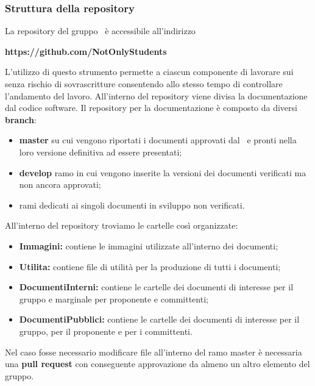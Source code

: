 \subsubsection{Struttura della repository}\label{StrutturaRepo}
La repository del gruppo \Gruppo\ è accessibile all'indirizzo
\begin{center}
	\textbf{https://github.com/NotOnlyStudents}
\end{center}
L'utilizzo di questo strumento permette a ciascun componente di lavorare sui  senza rischio di sovrascritture consentendo allo stesso tempo di controllare l'andamento del lavoro. 
All'interno del repository viene divisa la documentazione dal codice software.
\label{RepoDoc}Il repository per la documentazione è composto da diversi \textbf{branch}:
\begin{itemize}
	\item \textbf{master} su cui vengono riportati i documenti approvati dal \Responsabile\ e pronti nella loro versione definitiva ad essere presentati;
	\item \textbf{develop} ramo in cui vengono inserite la versioni dei documenti verificati ma non ancora approvati;
	\item rami dedicati ai singoli documenti in sviluppo non verificati.
\end{itemize}
All'interno del repository troviamo le cartelle così organizzate:
\begin{itemize}
	\item \textbf{Immagini:} contiene le immagini utilizzate all'interno dei documenti;
	\item \textbf{Utilita:} contiene file di utilità per la produzione di tutti i documenti;
	\item \textbf{DocumentiInterni:} contiene le cartelle dei documenti di interesse per il gruppo e marginale per proponente e committenti;
	\item \textbf{DocumentiPubblici:} contiene le cartelle dei documenti di interesse per il gruppo, per il proponente e per i committenti.
\end{itemize}
\label{ModificaRepo}Nel caso fosse necessario modificare file all'interno del ramo master è necessaria una \textbf{pull request} con conseguente approvazione da almeno un altro elemento del gruppo.